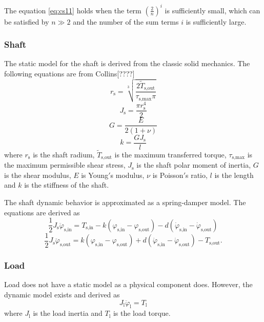 The equation \ref{eq:cs11} holds when the term $(\frac{2}{n})^i$ is sufficiently small, which can be satisfied by $n \gg 2$ and the number of the sum terms $i$ is sufficiently large. 

\subsubsection*{Shaft}
The static model for the shaft is derived from the classic solid mechanics. The following equations are from Collins[????]
\begin{equation} \label{eq:cs12}
r_{\text{s}} = \sqrt[3]{\frac{2\tilde{T}_{\text{s,out}}}{\tau_{\text{s,max}} \pi}}
\end{equation}
\begin{equation} \label{eq:cs13}
J_{\text{s}} = \frac{\pi r_{\text{s}}^4}{2}
\end{equation}
\begin{equation} \label{eq:cs14}
G = \frac{E}{2(1+\nu)}
\end{equation}
\begin{equation} \label{eq:cs15}
k = \frac{GJ_{\text{s}}}{l}
\end{equation}
where $r_{\text{s}}$ is the shaft radium, $\tilde{T}_{\text{s,out}}$ is the maximum transferred torque, $\tau_{\text{s,max}}$ is the maximum permissible shear stress, $J_{\text{s}}$ is the shaft polar moment of inertia, $G$ is the shear modulus, $E$ is Young$'$s modulus, $\nu$ is Poisson$'$s ratio, $l$ is the length and $k$ is the stiffness of the shaft.
 
The shaft dynamic behavior is approximated as a spring-damper model. The equations are derived as
\begin{equation} \label{eq:cs16}
\frac{1}{2}J_{\text{s}}\ddot{\varphi}_{\text{s,in}} = T_{\text{s,in}}-k(\varphi_{\text{s,in}}-\varphi_{\text{s,out}})-d(\dot{\varphi}_{\text{s,in}}-\dot{\varphi}_{\text{s,out}})
\end{equation}
\begin{equation} \label{eq:cs17}
\frac{1}{2}J_{\text{s}}\ddot{\varphi}_{\text{s,out}} = k(\varphi_{\text{s,in}}-\varphi_{\text{s,out}})+d(\dot{\varphi}_{\text{s,in}}-\dot{\varphi}_{\text{s,out}})-T_{\text{s,out}}.
\end{equation}
\subsubsection*{Load}
Load does not have a static model as a physical component does. However, the dynamic model exists and derived as
\begin{equation} \label{eq:cs18}
J_{\text{l}}\ddot{\varphi}_{\text{l}} = T_{\text{l}}
\end{equation}
where $J_{\text{l}}$ is the load inertia and $T_{\text{l}}$ is the load torque.  
